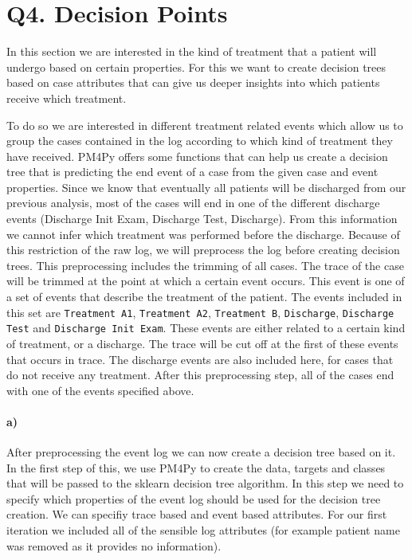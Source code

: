 \documentclass[12pt]{report}
\begin{document}
\section{Q4. Decision Points}

In this section we are interested in the kind of treatment that a patient will undergo based on certain properties. For this we want to create decision trees based on case attributes that can give us deeper insights into which patients receive which treatment.

To do so we are interested in different treatment related events which allow us to group the cases contained in the log according to which kind of treatment they have received. PM4Py offers some functions that can help us create a decision tree that is predicting the end event of a case from the given case and event properties. Since we know that eventually all patients will be discharged from our previous analysis, most of the cases will end in one of the different discharge events (Discharge Init Exam, Discharge Test, Discharge). From this information we cannot infer which treatment was performed before the discharge. Because of this restriction of the raw log, we will preprocess the log before creating decision trees. This preprocessing includes the trimming of all cases. The trace of the case will be trimmed at the point at which a certain event occurs. This event is one of a set of events that describe the treatment of the patient. The events included in this set are \texttt{Treatment A1}, \texttt{Treatment A2}, \texttt{Treatment B}, \texttt{Discharge}, \texttt{Discharge Test} and \texttt{Discharge Init Exam}. These events are either related to a certain kind of treatment, or a discharge. The trace will be cut off at the first of these events that occurs in trace. The discharge events are also included here, for cases that do not receive any treatment. After this preprocessing step, all of the cases end with one of the events specified above.

\paragraph{a)} 
After preprocessing the event log we can now create a decision tree based on it. In the first step of this, we use PM4Py to create the data, targets and classes that will be passed to the sklearn decision tree algorithm. In this step we need to specify which properties of the event log should be used for the decision tree creation. We can specifiy trace based and event based attributes. For our first iteration we included all of the sensible log attributes (for example patient name was removed as it provides no information).
\end{document}
